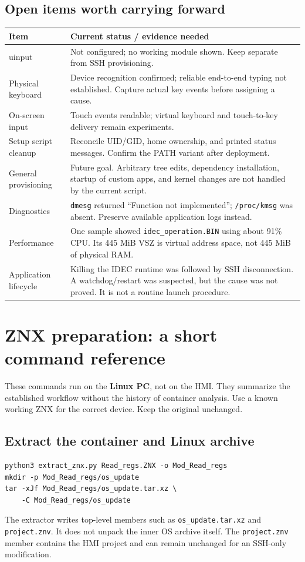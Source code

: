 \documentclass[10pt,letterpaper]{article}
\newcommand{\file}[1]{\nolinkurl{#1}}
\begin{document}
\subsection{Open items worth carrying forward}
\begin{tabularx}{\linewidth}{@{}p{1.55in}Y@{}}
\toprule
Item & Current status / evidence needed \\
\midrule
uinput & Not configured; no working module shown. Keep separate from SSH provisioning. \\
Physical keyboard & Device recognition confirmed; reliable end-to-end typing not established. Capture actual key events before assigning a cause. \\
On-screen input & Touch events readable; virtual keyboard and touch-to-key delivery remain experiments. \\
Setup script cleanup & Reconcile UID/GID, home ownership, and printed status messages. Confirm the PATH variant after deployment. \\
General provisioning & Future goal. Arbitrary tree edits, dependency installation, startup of custom apps, and kernel changes are not handled by the current script. \\
Diagnostics & \file{dmesg} returned ``Function not implemented''; \file{/proc/kmsg} was absent. Preserve available application logs instead. \\
Performance & One sample showed \file{idec_operation.BIN} using about 91\% CPU. Its 445 MiB VSZ is virtual address space, not 445 MiB of physical RAM. \\
Application lifecycle & Killing the IDEC runtime was followed by SSH disconnection. A watchdog/restart was suspected, but the cause was not proved. It is not a routine launch procedure. \\
\bottomrule
\end{tabularx}

\newpage
\section{ZNX preparation: a short command reference}\label{znx}
These commands run on the \textbf{Linux PC}, not on the HMI. They summarize the
established workflow without the history of container analysis. Use a known
working ZNX for the correct device. Keep the original unchanged.

\subsection{Extract the container and Linux archive}
\begin{lstlisting}
python3 extract_znx.py Read_regs.ZNX -o Mod_Read_regs
mkdir -p Mod_Read_regs/os_update
tar -xJf Mod_Read_regs/os_update.tar.xz \
    -C Mod_Read_regs/os_update
\end{lstlisting}
The extractor writes top-level members such as \file{os_update.tar.xz} and
\file{project.znv}. It does not unpack the inner OS archive itself. The
\file{project.znv} member contains the HMI project and can remain unchanged for
an SSH-only modification.
\end{document}
